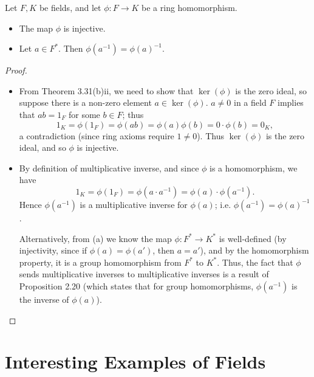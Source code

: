\documentclass[math1530-lecture-notes]{subfiles}
\begin{document}
\begin{proposition}[]{}
  Let $F,K$ be fields, and let $\phi:F\to K$ be a ring homomorphism.
  \begin{itemize}
    \item The map $\phi$ is injective.
    \item Let $a\in F^*$. Then $\phi(a^{-1})=\phi(a)^{-1}$.
  \end{itemize}
\end{proposition}
\begin{proof}[Proof]
  \begin{itemize}
    \item From Theorem 3.31(b)ii, we need to show that $\ker(\phi)$ is the zero ideal, so suppose
      there is a non-zero element $a\in \ker(\phi)$. $a\neq 0$ in a field $F$ implies that $ab=1_F$
      for some $b\in F$; thus \[
        1_K = \phi(1_F) = \phi(ab)=\phi(a)\phi(b)=0\cdot \phi(b)=0_K
      ,\] a contradiction (since ring axioms require $1\neq 0$). Thus $\ker(\phi)$ is the zero
      ideal, and so $\phi$ is injective.

    \item By definition of multiplicative inverse, and since $\phi$ is a homomorphism, we have \[
        1_K=\phi(1_F)=\phi(a\cdot a^{-1})=\phi(a)\cdot \phi(a^{-1})
      .\] Hence $\phi(a^{-1})$ is a multiplicative inverse for $\phi(a)$; i.e.
      $\phi(a^{-1})=\phi(a)^{-1}$.

      Alternatively, from (a) we know the map $\phi:F^*\to K^*$ is well-defined (by injectivity,
      since if $\phi(a)=\phi(a')$, then $a=a'$), and by the homomorphism property, it is a group
      homomorphism from $F^*$ to $K^*$. Thus, the fact that $\phi$ sends multiplicative inverses to
      multiplicative inverses is a result of Proposition 2.20 (which states that for group
      homomorphisms, $\phi(a^{-1})$ is the inverse of $\phi(a)$).
  \end{itemize}
\end{proof}


\section{Interesting Examples of Fields}
\end{document}
